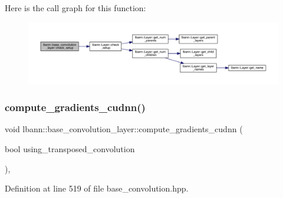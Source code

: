 Here is the call graph for this function\+:\nopagebreak
\begin{figure}[H]
\begin{center}
\leavevmode
\includegraphics[width=350pt]{classlbann_1_1base__convolution__layer_afa07aaa293d12cc7d28fbc8a96025900_cgraph}
\end{center}
\end{figure}
\mbox{\label{classlbann_1_1base__convolution__layer_ae46e6a975c443792c606817878dc4446}} 
\subsubsection{\texorpdfstring{compute\+\_\+gradients\+\_\+cudnn()}{compute\_gradients\_cudnn()}}
{\footnotesize\ttfamily void lbann\+::base\+\_\+convolution\+\_\+layer\+::compute\+\_\+gradients\+\_\+cudnn (\begin{DoxyParamCaption}\item[{bool}]{using\+\_\+transposed\+\_\+convolution }\end{DoxyParamCaption})\hspace{0.3cm}{\ttfamily [inline]}, {\ttfamily [protected]}}



Definition at line 519 of file base\+\_\+convolution.\+hpp.


